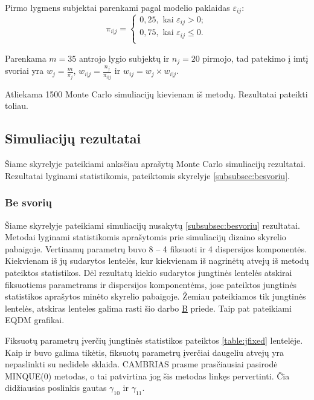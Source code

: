 \documentclass[12pt,a4paper]{article}
\begin{document}
\indent Pirmo lygmens subjektai parenkami pagal modelio paklaidas $\varepsilon_{ij}$:
\begin{equation}
\pi_{i|j}=
\left\{
\begin{array}{l}
0,25, \text{ kai } \varepsilon_{ij}>0;\\
0,75, \text{ kai } \varepsilon_{ij}\leq0.\\

\end{array} \right.
\end{equation}

\indent Parenkama $m=35$ antrojo lygio subjektų ir $n_j=20$ pirmojo, tad patekimo į imtį svoriai yra $w_j=\frac{m}{\pi_j}$, $w_{i|j}=\frac{n_j}{\pi_{i|j}}$ ir $w_{ij}=w_j\times w_{i|j}$.

\indent Atliekama 1500 Monte Carlo simuliacijų kievienam iš metodų. Rezultatai pateikti toliau.


\subsection{Simuliacijų rezultatai}
\indent Šiame skyrelyje pateikiami anksčiau aprašytų Monte Carlo simuliacijų rezultatai. Rezultatai lyginami statistikomis, pateiktomis skyrelyje \ref{subsubsec:besvoriu}.

\subsubsection{Be svorių}
\indent Šiame skyrelyje pateikiami simuliacijų nusakytų \ref{subsubsec:besvoriu} rezultatai. Metodai lyginami statistikomis aprašytomis prie simuliacijų dizaino skyrelio pabaigoje. Vertinamų parametrų buvo 8 -- 4 fiksuoti ir 4 dispersijos komponentės. Kiekvienam iš jų sudarytos lentelės, kur kiekvienam iš nagrinėtų atvejų iš metodų pateiktos statistikos. Dėl rezultatų kiekio sudarytos jungtinės lentelės atskirai fiksuotiems parametrams ir dispersijos komponentėms, jose pateiktos jungtinės statistikos aprašytos minėto skyrelio pabaigoje. Žemiau pateikiamos tik jungtinės lentelės, atskiras lenteles galima rasti šio darbo \hyperlink{appendixb}{B} priede. Taip pat pateikiami  EQDM grafikai.

\indent Fiksuotų parametrų įverčių jungtinės statistikos pateiktos \ref{table:jfixed} lentelėje. Kaip ir buvo galima tikėtis, fiksuotų parametrų įverčiai daugeliu atvejų yra nepaslinkti su nedidele sklaida. CAMBRIAS prasme prasčiausiai pasirodė MINQUE(0) metodas, o tai patvirtina jog šis metodas linkęs pervertinti. Čia didžiausias poslinkis gautas $\gamma_{10}$ ir $\gamma_{11}$.
\end{document}
